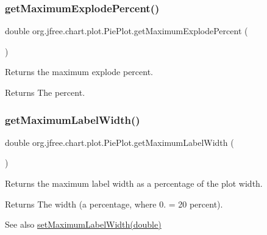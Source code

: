\subsubsection{\texorpdfstring{get\+Maximum\+Explode\+Percent()}{getMaximumExplodePercent()}}
{\footnotesize\ttfamily double org.\+jfree.\+chart.\+plot.\+Pie\+Plot.\+get\+Maximum\+Explode\+Percent (\begin{DoxyParamCaption}{ }\end{DoxyParamCaption})}

Returns the maximum explode percent.

\begin{DoxyReturn}{Returns}
The percent. 
\end{DoxyReturn}
\mbox{\label{classorg_1_1jfree_1_1chart_1_1plot_1_1_pie_plot_a07464db0f32860f10894704d8134fa8b}} 
\subsubsection{\texorpdfstring{get\+Maximum\+Label\+Width()}{getMaximumLabelWidth()}}
{\footnotesize\ttfamily double org.\+jfree.\+chart.\+plot.\+Pie\+Plot.\+get\+Maximum\+Label\+Width (\begin{DoxyParamCaption}{ }\end{DoxyParamCaption})}

Returns the maximum label width as a percentage of the plot width.

\begin{DoxyReturn}{Returns}
The width (a percentage, where 0. = 20 percent).
\end{DoxyReturn}
\begin{DoxySeeAlso}{See also}
\mbox{\hyperlink{classorg_1_1jfree_1_1chart_1_1plot_1_1_pie_plot_abf190f2dce528ec30e486a75e27c3f5e}{set\+Maximum\+Label\+Width(double)}} 
\end{DoxySeeAlso}
\mbox{\label{classorg_1_1jfree_1_1chart_1_1plot_1_1_pie_plot_a6effce452c78c1047deb15a8b0fd0c45}} 

